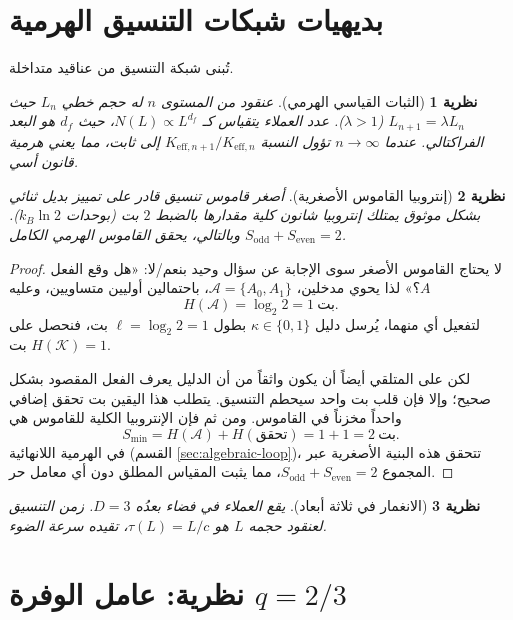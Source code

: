 \documentclass[12pt,a4paper]{article}
\newtheorem{theorem}{نظرية}[section]
\begin{document}
	\section{بديهيات شبكات التنسيق الهرمية}
	
	تُبنى شبكة التنسيق من عناقيد متداخلة.
	
	\begin{theorem}[الثبات القياسي الهرمي] \label{ax:A1}
		عنقود من المستوى \(n\) له حجم خطي \(L_n\) حيث \(L_{n+1} = \lambda L_n\) (\(\lambda > 1\)). عدد العملاء يتقياس كـ \(N(L) \propto L^{d_f}\)، حيث \(d_f\) هو البعد الفراكتالي. عندما \(n \to \infty\) تؤول النسبة \(K_{\mathrm{eff},n+1}/K_{\mathrm{eff},n}\) إلى ثابت، مما يعني هرمية قانون أسي.
	\end{theorem}
	
	\begin{theorem}[إنتروبيا القاموس الأصغرية]
		\label{thm:minimal-dict}
		أصغر قاموس تنسيق قادر على تمييز بديل ثنائي بشكل موثوق يمتلك إنتروبيا شانون كلية مقدارها بالضبط \(2\) بت (بوحدات \(k_B\ln 2\)). وبالتالي، يحقق القاموس الهرمي الكامل \(S_{\mathrm{odd}} + S_{\mathrm{even}} = 2\).
	\end{theorem}
	
	\begin{proof}
		لا يحتاج القاموس الأصغر سوى الإجابة عن سؤال وحيد بنعم/لا: «هل وقع الفعل \(A\)؟» لذا يحوي مدخلين، \(\mathcal{A} = \{A_0, A_1\}\)، باحتمالين أوليين متساويين، وعليه
		\[
		H(\mathcal{A}) = \log_2 2 = 1\ \text{بت}.
		\]
		لتفعيل أي منهما، يُرسل دليل \(\kappa \in \{0,1\}\) بطول \(\ell = \log_2 2 = 1\) بت، فنحصل على \(H(\mathcal{K}) = 1\) بت.
		
		لكن على المتلقي أيضاً أن يكون واثقاً من أن الدليل يعرف الفعل المقصود بشكل صحيح؛ وإلا فإن قلب بت واحد سيحطم التنسيق. يتطلب هذا اليقين بت تحقق إضافي واحداً مخزناً في القاموس. ومن ثم فإن الإنتروبيا الكلية للقاموس هي
		\[
		S_{\min} = H(\mathcal{A}) + H(\text{تحقق}) = 1 + 1 = 2\ \text{بت}.
		\]
		في الهرمية اللانهائية (القسم \ref{sec:algebraic-loop})، تتحقق هذه البنية الأصغرية عبر المجموع \(S_{\mathrm{odd}} + S_{\mathrm{even}} = 2\)، مما يثبت المقياس المطلق دون أي معامل حر.
	\end{proof}
	
	\begin{theorem}[الانغمار في ثلاثة أبعاد] \label{ax:A3}
		يقع العملاء في فضاء بعدُه \(D = 3\). زمن التنسيق لعنقود حجمه \(L\) هو \(\tau(L) = L/c\)، تقيده سرعة الضوء.
	\end{theorem}
	
	
	\section{نظرية: عامل الوفرة \(q = 2/3\)}
	
\end{document}
